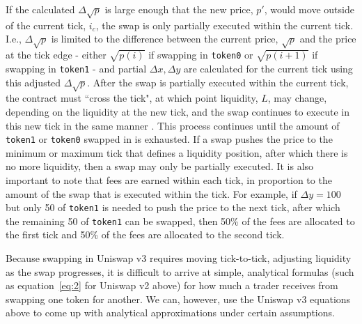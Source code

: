 \documentclass[11pt]{article}
\begin{document}
If the calculated $\Delta \sqrt{p}$ is large enough that the new price, $p'$, would move outside of the current tick, $i_c$, the swap is only partially executed within the current tick. I.e., $\Delta \sqrt{p}$ is limited to the difference between the current price, $\sqrt{p}$ and the price at the tick edge - either $\sqrt{p(i)}$ if swapping in \texttt{token0} or $\sqrt{p(i+1)}$ if swapping in \texttt{token1} - and partial $\Delta x, \Delta y$ are calculated for the current tick using this adjusted $\Delta \sqrt{p}$. After the swap is partially executed within the current tick, the contract must ``cross the tick", at which point liquidity, $L$, may change, depending on the liquidity at the new tick, and the swap continues to execute in this new tick in the same manner \citep{Uniswapv3}. This process continues until the amount of \texttt{token1} or \texttt{token0} swapped in is exhausted. If a swap pushes the price to the minimum or maximum tick that defines a liquidity position, after which there is no more liquidity, then a swap may only be partially executed. It is also important to note that fees are earned within each tick, in proportion to the amount of the swap that is executed within the tick. For example, if $\Delta y = 100$ but only 50 of \texttt{token1} is needed to push the price to the next tick, after which the remaining 50 of \texttt{token1} can be swapped, then 50\% of the fees are allocated to the first tick and 50\% of the fees are allocated to the second tick.

Because swapping in Uniswap v3 requires moving tick-to-tick, adjusting liquidity as the swap progresses, it is difficult to arrive at simple, analytical formulas (such as equation~\eqref{eq:2} for Uniswap v2 above) for how much a trader receives from swapping one token for another. We can, however, use the Uniswap v3 equations above to come up with analytical approximations under certain assumptions.
\end{document}
